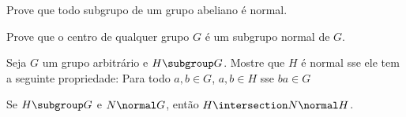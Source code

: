 \begin{exercise}
Prove que todo subgrupo de um grupo abeliano é normal.
\end{exercise}

\begin{exercise}
Prove que o centro de qualquer grupo $G$ é um subgrupo normal de $G$.
\end{exercise}

\begin{exercise}
Seja $G$ um grupo arbitrário e $H \subgroup G$. Mostre que $H$ é normal sse ele tem a seguinte propriedade:
\newline Para todo $a,b \in G$, $a,b \in H$ sse $ba \in G$
\end{exercise}

\begin{exercise}
Se $H \subgroup G$ e $N \normal G$, então $H \intersection N \normal H$.
\end{exercise}


